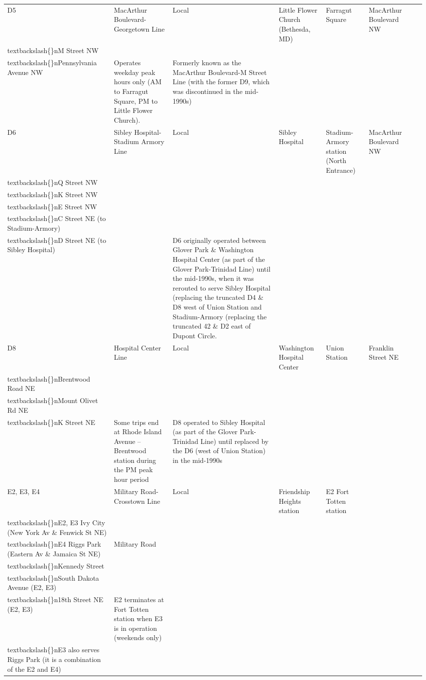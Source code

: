 \documentclass{article}
\begin{document}
\begin{tabular}{llllllll}
D5 & MacArthur Boulevard-Georgetown Line & Local & Little Flower Church (Bethesda, MD) & Farragut Square & MacArthur Boulevard NW\\textbackslash\{\}nM Street NW\\textbackslash\{\}nPennsylvania Avenue NW & Operates weekday peak hours only (AM to Farragut Square, PM to Little Flower Church). & Formerly known as the MacArthur Boulevard-M Street Line (with the former D9, which was discontinued in the mid-1990s) \\
D6 & Sibley Hospital-Stadium Armory Line & Local & Sibley Hospital & Stadium-Armory station (North Entrance) & MacArthur Boulevard NW\\textbackslash\{\}nQ Street NW\\textbackslash\{\}nK Street NW\\textbackslash\{\}nE Street NW\\textbackslash\{\}nC Street NE (to Stadium-Armory)\\textbackslash\{\}nD Street NE (to Sibley Hospital) &  & D6 originally operated between Glover Park \& Washington Hospital Center (as part of the Glover Park-Trinidad Line) until the mid-1990s, when it was rerouted to serve Sibley Hospital (replacing the truncated D4 \& D8 west of Union Station and Stadium-Armory (replacing the truncated 42 \& D2 east of Dupont Circle. \\
D8 & Hospital Center Line & Local & Washington Hospital Center & Union Station & Franklin Street NE\\textbackslash\{\}nBrentwood Road NE\\textbackslash\{\}nMount Olivet Rd NE\\textbackslash\{\}nK Street NE & Some trips end at Rhode Island Avenue – Brentwood station during the PM peak hour period & D8 operated to Sibley Hospital (as part of the Glover Park-Trinidad Line) until replaced by the D6 (west of Union Station) in the mid-1990s \\
E2, E3, E4 & Military Road-Crosstown Line & Local & Friendship Heights station & E2 Fort Totten station\\textbackslash\{\}nE2, E3 Ivy City (New York Av \& Fenwick St NE)\\textbackslash\{\}nE4 Riggs Park (Eastern Av \& Jamaica St NE) & Military Road\\textbackslash\{\}nKennedy Street\\textbackslash\{\}nSouth Dakota Avenue (E2, E3)\\textbackslash\{\}n18th Street NE (E2, E3) & E2 terminates at Fort Totten station when E3 is in operation (weekends only)\\textbackslash\{\}nE3 also serves Riggs Park (it is a combination of the E2 and E4) &  \\

\end{tabular}
\end{document}
